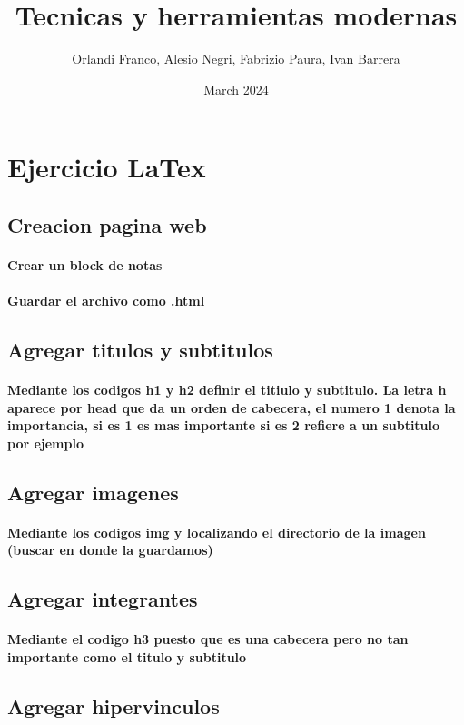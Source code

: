\documentclass{article}
\title{\Huge{Tecnicas y herramientas modernas}}
\author{Orlandi Franco, Alesio Negri, Fabrizio Paura, Ivan Barrera}
\date{March 2024}
\begin{document}
\maketitle

\section{\LARGE{Ejercicio LaTex}}

\subsection{Creacion pagina web}
\paragraph{Crear un block de notas}
\paragraph{Guardar el archivo como .html}
\subsection{Agregar titulos y subtitulos}
\paragraph{Mediante los codigos h1 y h2 definir el titiulo y subtitulo. La letra h aparece por head que da un orden de cabecera, el numero 1 denota la importancia, si es 1 es mas importante si es 2 refiere a un subtitulo por ejemplo}
\subsection{Agregar imagenes}
\paragraph{Mediante los codigos img y localizando el directorio de la imagen (buscar en donde la guardamos)}
\subsection{Agregar integrantes}
\paragraph{Mediante el codigo h3 puesto que es una cabecera pero no tan importante como el titulo y subtitulo}
\subsection{Agregar hipervinculos}
\end{document}
